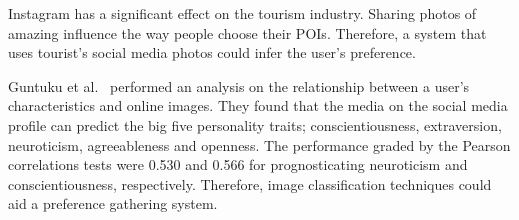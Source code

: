 Instagram has a significant effect on the tourism
industry. Sharing photos of amazing 
influence the way people choose their
POIs\cite{Terttunen2017}. Therefore, a system that
uses tourist's social media photos could infer the
user's preference.

Guntuku et al.~\cite{Guntuku2017} performed an
analysis on the relationship between a user's
characteristics and online images. They found that the
media on the social media profile can predict the big
five personality traits; conscientiousness,
extraversion, neuroticism, agreeableness and openness.
The performance graded by the Pearson correlations
tests were 0.530 and 0.566 for prognosticating
neuroticism and conscientiousness, respectively. 
Therefore, image classification
techniques could aid a preference
gathering system.

